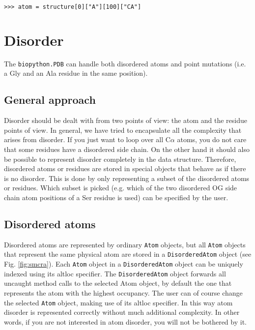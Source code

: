 \begin{verbatim}
>>> atom = structure[0]["A"][100]["CA"]
\end{verbatim}

\section{Disorder}

The \verb+biopython.PDB+ can handle both disordered atoms and point mutations (i.e. a
Gly and an Ala residue in the same position).

\subsection{General approach}
\label{sec:disorder_problems}

Disorder should be dealt with from two points of view: the atom and the residue
points of view. In general, we have tried to encapsulate all the complexity that
arises from disorder. If you just want to loop over all C$\alpha$ atoms,
you do not care that some residues have a disordered side chain. On the other
hand it should also be possible to represent disorder completely in the data
structure. Therefore, disordered atoms or residues are stored in special objects
that behave as if there is no disorder. This is done by only representing a
subset of the disordered atoms or residues. Which subset is picked (e.g. which
of the two disordered OG side chain atom positions of a Ser residue is used)
can be specified by the user.

\subsection{Disordered atoms}
\label{sec:disordered_atoms}

Disordered atoms are represented by ordinary \texttt{Atom} objects, but
all \texttt{Atom} objects that represent the same physical atom are stored
in a \texttt{Disordered\-Atom} object (see Fig. \ref{fig:smcra}).
Each \texttt{Atom} object in a \texttt{Disordered\-Atom} object can
be uniquely indexed using its altloc specifier. The \texttt{Disordered\-Atom}
object forwards all uncaught method calls to the selected Atom object,
by default the one that represents the atom with the highest
occupancy. The user can of course change the selected \texttt{Atom}
object, making use of its altloc specifier. In this way atom disorder
is represented correctly without much additional complexity. In other
words, if you are not interested in atom disorder, you will not be
bothered by it.

